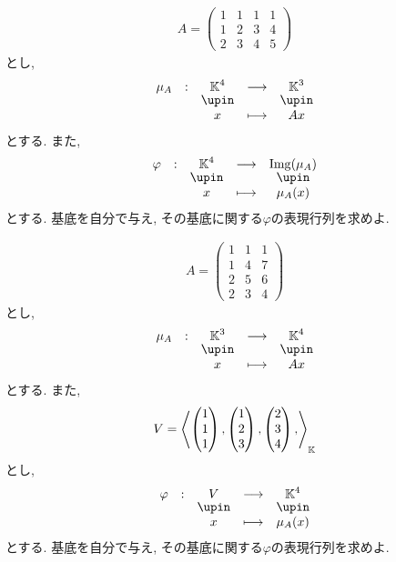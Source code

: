 \begin{quiz}
  \begin{align*}
    A=
    \begin{pmatrix}
      1&1&1&1\\
      1&2&3&4\\
      2&3&4&5
    \end{pmatrix}
  \end{align*}
  とし,
  \begin{align*}
    \shazo{\mu_A}{\KK^4}{\KK^3}
    {x}{Ax}
  \end{align*}
  とする.
  また,
  \begin{align*}
    \shazo{\varphi}{\KK^4}{\Img(\mu_A)}
    {x}{\mu_A(x)}
  \end{align*}
  とする.
  基底を自分で与え,
  その基底に関する$\varphi$の表現行列を求めよ.
\end{quiz}

\begin{quiz}
  \begin{align*}
    A=
    \begin{pmatrix}
      1&1&1\\
      1&4&7\\
      2&5&6\\
      2&3&4
    \end{pmatrix}
  \end{align*}
  とし,
  \begin{align*}
    \shazo{\mu_A}{\KK^3}{\KK^4}
    {x}{Ax}
  \end{align*}
  とする.
  また,
  \begin{align*}
    V=\Braket{
      \begin{pmatrix}1\\1\\1\end{pmatrix},
      \begin{pmatrix}1\\2\\3\end{pmatrix},
      \begin{pmatrix}2\\3\\4\end{pmatrix},
    }_{\mathbb{K}}
  \end{align*}
  とし,
  \begin{align*}
    \shazo{\varphi}{V}{\KK^4}
    {x}{\mu_A(x)}
  \end{align*}
  とする.
  基底を自分で与え,
  その基底に関する$\varphi$の表現行列を求めよ.
\end{quiz}

